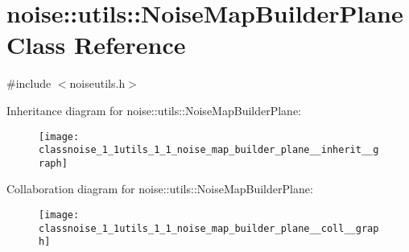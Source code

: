\hypertarget{classnoise_1_1utils_1_1_noise_map_builder_plane}{\section{noise\+:\+:utils\+:\+:Noise\+Map\+Builder\+Plane Class Reference}
\label{classnoise_1_1utils_1_1_noise_map_builder_plane}
}


{\ttfamily \#include $<$noiseutils.\+h$>$}



Inheritance diagram for noise\+:\+:utils\+:\+:Noise\+Map\+Builder\+Plane\+:\nopagebreak
\begin{figure}[H]
\begin{center}
\leavevmode
\texttt{[image: classnoise\_1\_1utils\_1\_1\_noise\_map\_builder\_plane\_\_inherit\_\_graph]}
\end{center}
\end{figure}


Collaboration diagram for noise\+:\+:utils\+:\+:Noise\+Map\+Builder\+Plane\+:\nopagebreak
\begin{figure}[H]
\begin{center}
\leavevmode
\texttt{[image: classnoise\_1\_1utils\_1\_1\_noise\_map\_builder\_plane\_\_coll\_\_graph]}
\end{center}
\end{figure}
